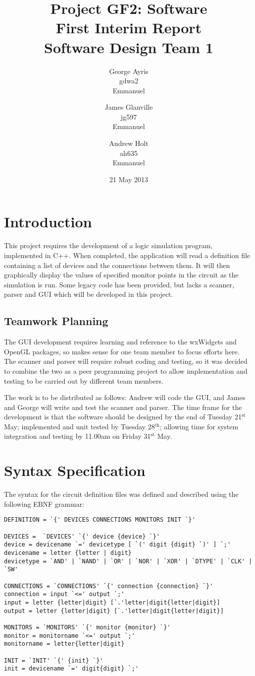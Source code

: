 \documentclass[a4paper,11pt]{article}  %
\title{Project GF2: Software\\ First Interim Report\\ Software Design
  Team 1}
\author{George Ayris\\ gdwa2\\ Emmanuel \and James Glanville\\
jg597\\ Emmanuel \and Andrew Holt\\ ah635\\ Emmanuel}
\date{21 May 2013}
\begin{document}
\maketitle

\section{Introduction}

This project requires the development of a logic simulation program,
implemented in C++. When completed, the application will read a
definition file containing a list of devices and the connections
between them. It will then graphically display the values of specified
monitor points in the circuit as the simulation is run. Some legacy
code has been provided, but lacks a scanner, parser and GUI which will
be developed in this project.

\subsection{Teamwork Planning}

The GUI development requires learning and reference to the wxWidgets
and OpenGL packages, so makes sense for one team member to focus
efforts here. The scanner and parser will require robust coding and
testing, so it was decided to combine the two as a peer programming
project to allow implementation and testing to be carried out by
different team members.

The work is to be distributed as follows: Andrew will code the GUI,
and James and George will write and test the scanner and parser. The
time frame for the development is that the software should be designed
by the end of Tuesday 21$^{\mathrm{st}}$ May; implemented and unit
tested by Tuesday 28$^{\mathrm{th}}$; allowing time for system
integration and testing by 11.00am on Friday 31$^{\mathrm{st}}$ May.

\section{Syntax Specification}

The syntax for the circuit definition files was defined and described
using the following EBNF grammar:
\begin{lstlisting}
DEFINITION = `{' DEVICES CONNECTIONS MONITORS INIT `}'

DEVICES =  `DEVICES' `{' device {device} `}'
device = devicename `=' devicetype [ `(' digit {digit} `)' ] `;'
devicename = letter {letter | digit}
devicetype = `AND' | `NAND' | `OR' | `NOR' | `XOR' | `DTYPE' | `CLK' | `SW'

CONNECTIONS = `CONNECTIONS' `{' connection {connection} `}'
connection = input `<=' output `;'
input = letter {letter|digit} [`.'letter|digit{letter|digit}]
output = letter {letter|digit} [`.'letter|digit{letter|digit}]

MONITORS = `MONITORS' `{' monitor {monitor} `}'
monitor = monitorname `<=' output `;'
monitorname = letter{letter|digit}

INIT = `INIT' `{' {init} `}'
init = devicename `=' digit{digit} `;'
\end{lstlisting}
\end{document}
